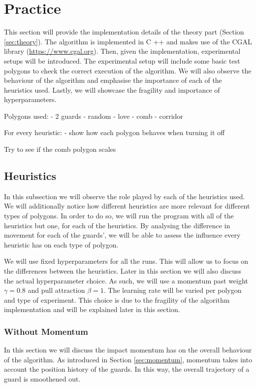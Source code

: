 \section{Practice}
\label{sec:experiments}

This section will provide the implementation details of the theory part (Section \ref{sec:theory}). The algorithm is implemented in C ++ and makes use of the CGAL library (\url{https://www.cgal.org}). 
Then, given the implementation, experimental setups will be introduced. The experimental setup will include some basic test polygons to check the correct execution of the algorithm. We will also observe the behaviour of the algorithm and emphasise the importance of each of the heuristics used. Lastly, we will showcase the fragility and importance of hyperparameters.

Polygons used:
- 2 guards
- random
- love
- comb
- corridor

For every heuristic:
- show how each polygon behaves when turning it off

Try to see if the comb polygon scales

\subsection{Heuristics}
In this subsection we will observe the role played by each of the heuristics used. We will additionally notice how different heuristics are more relevant for different types of polygons. In order to do so, we will run the program with all of the heuristics but one, for each of the heuristics. By analysing the difference in movement for each of the guards', we will be able to assess the influence every heuristic has on each type of polygon.

We will use fixed hyperparameters for all the runs. This will allow us to focus on the differences between the heuristics. Later in this section we will also discuss the actual hyperparameter choice. As such, we will use a momentum past weight $\gamma = 0.8$ and pull attraction $\beta = 1$. The learning rate will be varied per polygon and type of experiment. This choice is due to the fragility of the algorithm implementation and will be explained later in this section.

\subsubsection{Without Momentum}
In this section we will discuss the impact momentum has on the overall behaviour of the algorithm. As introduced in Section \ref{sec:momentum}, momentum takes into account the position history of the guards. In this way, the overall trajectory of a guard is smoothened out.

